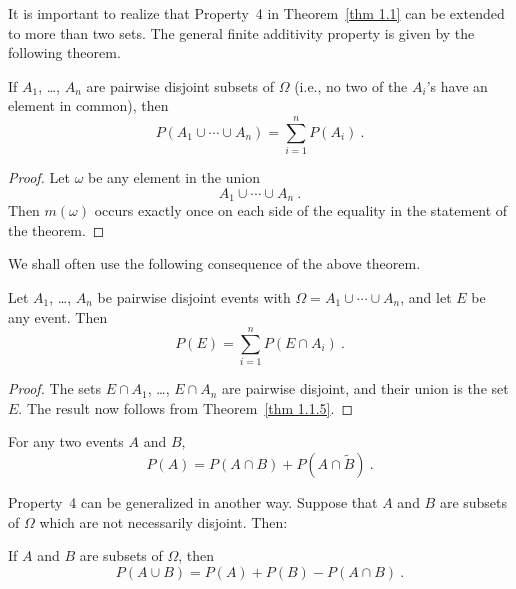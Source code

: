 \par
It is important to realize that Property~4 in Theorem~\ref{thm 1.1} 
can be extended to more than two sets.  The general finite additivity
property is given by the following
theorem.\hfil\break
\begin{theorem}\label{thm 1.1.5}
\leanok
If $A_1$, \dots, $A_n$ are pairwise disjoint subsets of $\Omega$
(i.e., no two of the $A_i$'s have an element in common), then
$$
P(A_1 \cup \cdots \cup A_n) = \sum_{i = 1}^n P(A_i)\ .
$$
\end{theorem} 
\begin{proof}
\leanok
	Let $\omega$ be any element in the union
	$$A_1 \cup \cdots \cup A_n\ .$$
	Then $m(\omega)$ occurs exactly once on each side of the equality in the
	statement of the theorem.
\end{proof}
\par
We shall often use the following consequence of the above theorem.
\begin{theorem}\label{thm 1.2}
\leanok
 Let $A_1$, \dots, $A_n$ be pairwise disjoint events with $\Omega = A_1
\cup \cdots \cup A_n$, and let $E$ be any event.  Then
$$
P(E) = \sum_{i = 1}^n P(E \cap A_i)\ .
$$
\end{theorem}
\begin{proof}
\leanok
{}
	The sets $E \cap A_1$, \dots, $E \cap A_n$ are pairwise disjoint, and their 
	union is the set $E$.  The result now follows from Theorem~\ref{thm 1.1.5}.
\end{proof}
\begin{corollary}\label{cor 1.1}
\leanok
{}
For any two events $A$ and $B$,
$$
P(A) = P(A \cap B) + P(A \cap \tilde B)\ .
$$
\end{corollary}
\par
Property~4 can be generalized in another way.  Suppose that $A$ and $B$ are
subsets of $\Omega$ which are not necessarily disjoint.  Then:\hfil\break
\begin{theorem}\label{thm 1.2.5}
\leanok
If $A$ and $B$ are subsets of $\Omega$, then
\begin{equation}
P(A \cup B) = P(A) + P(B) - P(A \cap B)\ .
\label{eq 1.1}
\end{equation}                                                                     
\end{theorem}
